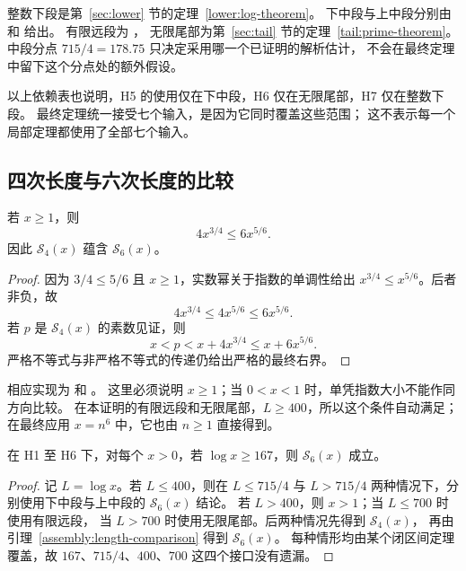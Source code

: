 整数下段是第~\ref{sec:lower} 节的定理~\ref{lower:log-theorem}。
下中段与上中段分别由
 和
 给出。
有限远段为
，
无限尾部为第~\ref{sec:tail} 节的定理~\ref{tail:prime-theorem}。
中段分点 $715/4=178.75$ 只决定采用哪一个已证明的解析估计，
不会在最终定理中留下这个分点处的额外假设。

以上依赖表也说明，H5 的使用仅在下中段，H6 仅在无限尾部，H7 仅在整数下段。
最终定理统一接受七个输入，是因为它同时覆盖这些范围；
这不表示每一个局部定理都使用了全部七个输入。

\subsection{四次长度与六次长度的比较}

\begin{lemma}[短区间长度的包含关系]\label{assembly:length-comparison}
若 $x\geq1$，则
\begin{equation}\label{assembly:length-inequality}
 4x^{3/4}\leq6x^{5/6}.
\end{equation}
因此 $\mathcal S_4(x)$ 蕴含 $\mathcal S_6(x)$。
\end{lemma}

\begin{proof}
因为 $3/4\leq5/6$ 且 $x\geq1$，实数幂关于指数的单调性给出
$x^{3/4}\leq x^{5/6}$。后者非负，故
\[
 4x^{3/4}\leq4x^{5/6}\leq6x^{5/6}.
\]
若 $p$ 是 $\mathcal S_4(x)$ 的素数见证，则
\[
 x<p<x+4x^{3/4}\leq x+6x^{5/6}.
\]
严格不等式与非严格不等式的传递仍给出严格的最终右界。
\end{proof}

相应实现为  和
。
这里必须说明 $x\geq1$；当 $0<x<1$ 时，单凭指数大小不能作同方向比较。
在本证明的有限远段和无限尾部，$L\geq400$，所以这个条件自动满足；
在最终应用 $x=n^6$ 中，它也由 $n\geq1$ 直接得到。

\begin{proposition}[统一的解析上段]\label{assembly:analytic-range}
在 H1 至 H6 下，对每个 $x>0$，若 $\log x\geq167$，则
$\mathcal S_6(x)$ 成立。
\end{proposition}

\begin{proof}
记 $L=\log x$。若 $L\leq400$，则在
$L\leq715/4$ 与 $L>715/4$ 两种情况下，分别使用下中段与上中段的
$\mathcal S_6(x)$ 结论。
若 $L>400$，则 $x>1$；当 $L\leq700$ 时使用有限远段，
当 $L>700$ 时使用无限尾部。后两种情况先得到 $\mathcal S_4(x)$，
再由引理~\ref{assembly:length-comparison} 得到 $\mathcal S_6(x)$。
每种情形均由某个闭区间定理覆盖，故 $167$、$715/4$、$400$、$700$
这四个接口没有遗漏。
\end{proof}

